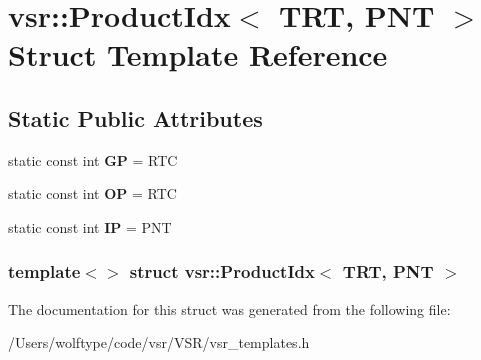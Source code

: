 \hypertarget{structvsr_1_1_product_idx_3_01_t_r_t_00_01_p_n_t_01_4}{\section{vsr\-:\-:Product\-Idx$<$ T\-R\-T, P\-N\-T $>$ Struct Template Reference}
\label{structvsr_1_1_product_idx_3_01_t_r_t_00_01_p_n_t_01_4}
}
\subsection*{Static Public Attributes}
\begin{DoxyCompactItemize}
\item 
\hypertarget{structvsr_1_1_product_idx_3_01_t_r_t_00_01_p_n_t_01_4_aa24a7b7b0573f0801c401ef8f4d17f69}{static const int {\bfseries G\-P} = R\-T\-C}\label{structvsr_1_1_product_idx_3_01_t_r_t_00_01_p_n_t_01_4_aa24a7b7b0573f0801c401ef8f4d17f69}

\item 
\hypertarget{structvsr_1_1_product_idx_3_01_t_r_t_00_01_p_n_t_01_4_a6b54f470be7d8b61899ce67871b329fb}{static const int {\bfseries O\-P} = R\-T\-C}\label{structvsr_1_1_product_idx_3_01_t_r_t_00_01_p_n_t_01_4_a6b54f470be7d8b61899ce67871b329fb}

\item 
\hypertarget{structvsr_1_1_product_idx_3_01_t_r_t_00_01_p_n_t_01_4_ab46fabfaeccc98b7dd59fb1f471ba375}{static const int {\bfseries I\-P} = P\-N\-T}\label{structvsr_1_1_product_idx_3_01_t_r_t_00_01_p_n_t_01_4_ab46fabfaeccc98b7dd59fb1f471ba375}

\end{DoxyCompactItemize}
\subsubsection*{template$<$$>$ struct vsr\-::\-Product\-Idx$<$ T\-R\-T, P\-N\-T $>$}



The documentation for this struct was generated from the following file\-:\begin{DoxyCompactItemize}
\item 
/\-Users/wolftype/code/vsr/\-V\-S\-R/vsr\-\_\-templates.\-h\end{DoxyCompactItemize}
